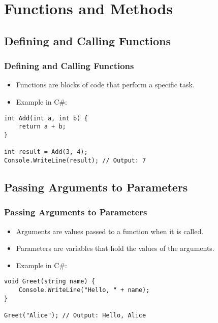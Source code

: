 \section{Functions and Methods}

\subsection{Defining and Calling Functions}
\begin{frame}[fragile]
\frametitle{Defining and Calling Functions}
\begin{itemize}
    \item Functions are blocks of code that perform a specific task.
    \item Example in C\#:
\end{itemize}
\begin{lstlisting}
int Add(int a, int b) {
    return a + b;
}

int result = Add(3, 4);
Console.WriteLine(result); // Output: 7
\end{lstlisting}
\end{frame}

\subsection{Passing Arguments to Parameters}
\begin{frame}[fragile]
\frametitle{Passing Arguments to Parameters}
\begin{itemize}
    \item Arguments are values passed to a function when it is called.
    \item Parameters are variables that hold the values of the arguments.
    \item Example in C\#:
\end{itemize}
\begin{lstlisting}
void Greet(string name) {
    Console.WriteLine("Hello, " + name);
}

Greet("Alice"); // Output: Hello, Alice
\end{lstlisting}
\end{frame}
